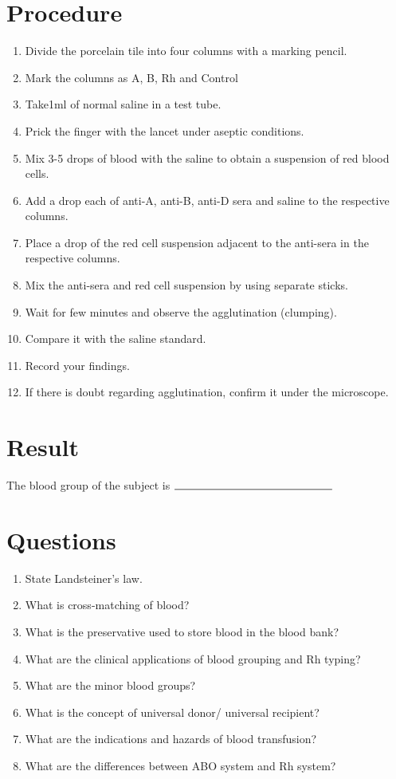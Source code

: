 \documentclass[a4paper,12pt,openany,oneside]{book}
\begin{document}
									\section*{Procedure}
									\begin{enumerate}
										\item{Divide the porcelain tile into four columns with a marking pencil.}
										\item{Mark the columns as A, B, Rh and Control}
										\item{Take1ml of normal saline in a test tube.}
										\item{Prick the finger with the lancet under aseptic conditions.}
										\item{Mix 3-5 drops of blood with the saline to obtain a suspension of red blood cells.}
										\item{Add a drop each of anti-A, anti-B, anti-D sera and saline to the respective columns.}
										\item{Place a drop of the red cell suspension adjacent to the anti-sera in the respective columns.}
										\item{Mix the anti-sera and red cell suspension by using separate sticks.}
										\item{Wait for few minutes and observe the agglutination (clumping).}
										\item{Compare it with the saline standard.}
										\item{Record your findings.}
										\item{If there is doubt regarding agglutination, confirm it under the microscope.}
									\end{enumerate}
									\section*{Result}
									The blood group of the subject is $\rule{5cm}{0.5pt}$
									\section*{Questions}
									\begin{enumerate}
										\item{State Landsteiner’s law.}
										\item{What is cross-matching of blood?}
										\item{What is the preservative used to store blood in the blood bank?}
										\item{What are the clinical applications of blood grouping and Rh typing?}
										\item{What are the minor blood groups?}
										\item{What is the concept of universal donor/ universal recipient?}
										\item{What are the indications and hazards of blood transfusion?}
										\item{What are the differences between ABO system and Rh system?}
									\end{enumerate}
\end{document}
